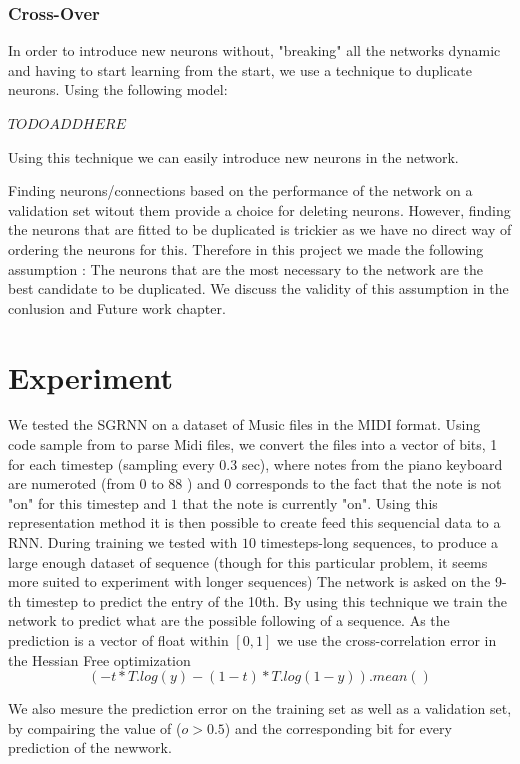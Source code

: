 \subsubsection{Cross-Over}

In order to introduce new neurons without, "breaking" all the networks dynamic and having to start learning from the start, we use a technique to duplicate neurons. Using the following model: 

$TODO ADD HERE$ 

Using this technique we can easily introduce new neurons in the network.

Finding neurons/connections based on the performance of the network on a validation set witout them provide a choice for deleting neurons. However, finding the neurons that are fitted to be duplicated is trickier as we have no direct way of ordering the neurons for this. Therefore in this project we made the following assumption : The neurons that are the most necessary to the network are the best candidate to be duplicated. We discuss the validity of this assumption in the conlusion and Future work chapter.  


\section{Experiment}

We tested the SGRNN on a dataset of Music files in the MIDI format. Using code sample from \cite{boulanger2012modeling} to parse Midi files, we convert the files into a vector of bits, 1 for each timestep (sampling every 0.3 sec), where notes from the piano keyboard are numeroted (from $0$ to $88$ ) and $0$ corresponds to the fact that the note is not "on" for this timestep and $1$ that the note is currently "on". Using this representation method it is then possible to create feed this sequencial data to a RNN. During training we tested with $10$ timesteps-long sequences, to produce a large enough dataset of sequence (though for this particular problem, it seems more suited to experiment with longer sequences) The network is asked on the 9-th timestep to predict the entry of the 10th. By using this technique we train the network to predict what are the possible following of a sequence. As the prediction is a vector of float within $[0, 1]$ we use the cross-correlation error in the Hessian Free optimization 
$$ (-t* T.log(y) - (1-t)* T.log(1-y)).mean() $$

We also mesure the prediction error on the training set as well as a validation set, by compairing the value of ($o>0.5$) and the corresponding bit for every prediction of the newwork.

